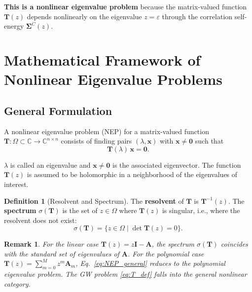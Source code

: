 \documentclass[12pt,a4paper]{article}
\newtheorem{remark}[theorem]{Remark}
\theoremstyle{definition}
\newtheorem{definition}[theorem]{Definition}
\newcommand{\key}[1]{\textcolor{keypoint}{\textbf{#1}}}
\begin{document}
\key{This is a nonlinear eigenvalue problem} because the matrix-valued function $\mathbf{T}(z)$ depends nonlinearly on the eigenvalue $z = \varepsilon$ through the correlation self-energy $\mathbf{\Sigma}^{C}(z)$.

\section{Mathematical Framework of Nonlinear Eigenvalue Problems}

\subsection{General Formulation}

A nonlinear eigenvalue problem (NEP) for a matrix-valued function $\mathbf{T}: \Omega \subset \mathbb{C} \to \mathbb{C}^{n \times n}$ consists of finding pairs $(\lambda, \mathbf{x})$ with $\mathbf{x} \neq \mathbf{0}$ such that
\begin{equation}\label{eq:NEP_general}
\boxed{\mathbf{T}(\lambda)\,\mathbf{x} = \mathbf{0}}.
\end{equation}

$\lambda$ is called an eigenvalue and $\mathbf{x} \neq \mathbf{0}$ is the associated eigenvector. The function $\mathbf{T}(z)$ is assumed to be holomorphic in a neighborhood of the eigenvalues of interest.

\begin{definition}[Resolvent and Spectrum]
The \textbf{resolvent} of $\mathbf{T}$ is $\mathbf{T}^{-1}(z)$. The \textbf{spectrum} $\sigma(\mathbf{T})$ is the set of $z \in \Omega$ where $\mathbf{T}(z)$ is singular, i.e., where the resolvent does not exist:
\begin{equation}
\sigma(\mathbf{T}) = \{ z \in \Omega \mid \det\mathbf{T}(z) = 0 \}.
\end{equation}
\end{definition}

\begin{remark}
For the linear case $\mathbf{T}(z) = z\mathbf{I} - \mathbf{A}$, the spectrum $\sigma(\mathbf{T})$ coincides with the standard set of eigenvalues of $\mathbf{A}$. For the polynomial case $\mathbf{T}(z) = \sum_{m=0}^{M} z^{m}\mathbf{A}_m$, Eq.~\eqref{eq:NEP_general} reduces to the polynomial eigenvalue problem. The GW problem \eqref{eq:T_def} falls into the general nonlinear category.
\end{remark}
\end{document}
